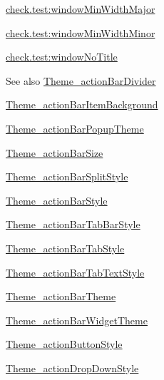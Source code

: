 {\ttfamily \hyperlink{classcheck_1_1test_1_1_r_1_1styleable_affa53ed5805b4fc7b71d664cddc7b88e}{check.\+test\+:window\+Min\+Width\+Major}}

{\ttfamily \hyperlink{classcheck_1_1test_1_1_r_1_1styleable_aa7f575c9c5c290ba568031edf16a3bc6}{check.\+test\+:window\+Min\+Width\+Minor}}

{\ttfamily \hyperlink{classcheck_1_1test_1_1_r_1_1styleable_a565578f526c7a9432c574c995bc827e2}{check.\+test\+:window\+No\+Title}}

\begin{DoxySeeAlso}{See also}
\hyperlink{classcheck_1_1test_1_1_r_1_1styleable_a24a4a7345478079d2842c3c6b948cee8}{Theme\+\_\+action\+Bar\+Divider} 

\hyperlink{classcheck_1_1test_1_1_r_1_1styleable_a0452c18018a280bc2c98c290c760c4de}{Theme\+\_\+action\+Bar\+Item\+Background} 

\hyperlink{classcheck_1_1test_1_1_r_1_1styleable_a73283effe9ac39eb90c34200c9d71c48}{Theme\+\_\+action\+Bar\+Popup\+Theme} 

\hyperlink{classcheck_1_1test_1_1_r_1_1styleable_af17d29383b2372457182672f93aeb8e6}{Theme\+\_\+action\+Bar\+Size} 

\hyperlink{classcheck_1_1test_1_1_r_1_1styleable_a9f5d8b45ed85a61b92f887aa336f3adf}{Theme\+\_\+action\+Bar\+Split\+Style} 

\hyperlink{classcheck_1_1test_1_1_r_1_1styleable_a08cd7000f459aa75d7817e7a3a7c3229}{Theme\+\_\+action\+Bar\+Style} 

\hyperlink{classcheck_1_1test_1_1_r_1_1styleable_a4f15c7fba5e3c2d9c43d6e29262b809b}{Theme\+\_\+action\+Bar\+Tab\+Bar\+Style} 

\hyperlink{classcheck_1_1test_1_1_r_1_1styleable_ac7c5d9db6774de90f8feae957a5c9525}{Theme\+\_\+action\+Bar\+Tab\+Style} 

\hyperlink{classcheck_1_1test_1_1_r_1_1styleable_a1733f98ca23b42c6fdd6a6e560392fc2}{Theme\+\_\+action\+Bar\+Tab\+Text\+Style} 

\hyperlink{classcheck_1_1test_1_1_r_1_1styleable_a0c926c0b572d1a456f5181c48e9b6eef}{Theme\+\_\+action\+Bar\+Theme} 

\hyperlink{classcheck_1_1test_1_1_r_1_1styleable_a11aebf359000ff5df5b3cb3760b461ca}{Theme\+\_\+action\+Bar\+Widget\+Theme} 

\hyperlink{classcheck_1_1test_1_1_r_1_1styleable_a15e83ab3003cd39702fb77872405c667}{Theme\+\_\+action\+Button\+Style} 

\hyperlink{classcheck_1_1test_1_1_r_1_1styleable_a1701f361e9f3c65f693656182107e83b}{Theme\+\_\+action\+Drop\+Down\+Style} 


\end{DoxySeeAlso}
